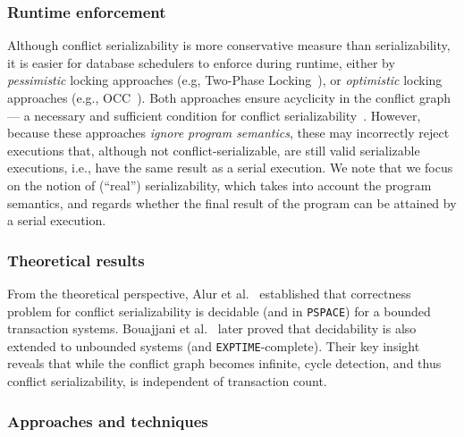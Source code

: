 \subsubsection{Runtime enforcement}
Although conflict serializability is more conservative measure than 
serializability, it is easier for database schedulers to enforce during 
runtime, either by \textit{pessimistic} locking approaches (e.g, Two-Phase 
Locking~\cite{BeHaGo87}), or \textit{optimistic} locking 
approaches (e.g., OCC~\cite{KuRo81, BuMo06}).
%
Both approaches ensure acyclicity in the conflict graph --- a necessary and 
sufficient condition for conflict serializability~\cite{SiMa10}. However, 
because these approaches \textit{ignore program semantics}, these may 
incorrectly reject executions that, although not conflict-serializable, are 
still valid serializable executions, i.e., have the same result as a serial 
execution. 
%
We note that we focus on the notion of (``real'') serializability, which takes 
into account the program semantics, and regards whether the final result of the 
program can be attained by a serial execution.
%

\subsubsection{Theoretical results}
From the theoretical perspective, Alur et al.~\cite{AlMcPe96} established that 
correctness problem for conflict serializability is decidable (and in 
\texttt{PSPACE}) 
for a bounded transaction systems. Bouajjani et al.~\cite{BoEmEnHa13} later 
proved that decidability is also extended to unbounded systems (and 
\texttt{EXPTIME}-complete). Their key insight reveals that while the conflict 
graph 
becomes infinite, cycle detection, and thus conflict serializability, is 
independent of transaction count. 
%
%
\subsubsection{Approaches and techniques}

